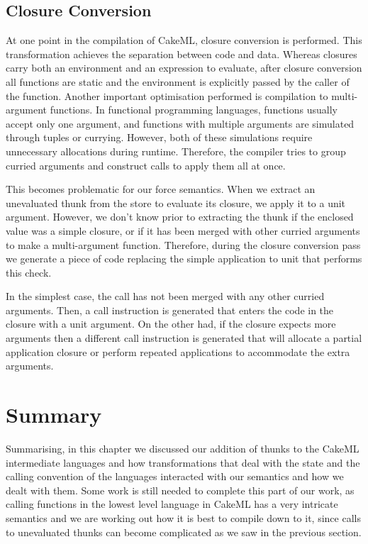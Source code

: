 \subsection{Closure Conversion}

At one point in the compilation of CakeML, closure conversion
\cite{reynolds1972definitional} is performed. This transformation achieves the
separation between code and data. Whereas closures carry both an environment and
an expression to evaluate, after closure conversion all functions are static
and the environment is explicitly passed by the caller of the function.
Another important optimisation performed is compilation to multi-argument
functions. In functional programming languages, functions usually accept only
one argument, and functions with multiple arguments are simulated through tuples
or currying. However, both of these simulations require unnecessary allocations
during runtime. Therefore, the compiler tries to group curried arguments and
construct calls to apply them all at once.

This becomes problematic for our force semantics. When we extract an unevaluated
thunk from the store to evaluate its closure, we apply it to a unit argument.
However, we don't know prior to extracting the thunk if the enclosed value was a
simple closure, or if it has been merged with other curried arguments to make a
multi-argument function. Therefore, during the closure conversion pass we
generate a piece of code replacing the simple application to unit that performs
this check.

In the simplest case, the call has not been merged with any other curried
arguments. Then, a call instruction is generated that enters the code in the
closure with a unit argument. On the other had, if the closure expects more
arguments then a different call instruction is generated that will allocate a
partial application closure or perform repeated applications to accommodate the
extra arguments.

\section{Summary}

Summarising, in this chapter we discussed our addition of thunks to the CakeML
intermediate languages and how transformations that deal with the state and the
calling convention of the languages interacted with our semantics and how we
dealt with them. Some work is still needed to complete this part of our work, as
calling functions in the lowest level language in CakeML has a very intricate
semantics and we are working out how it is best to compile down to it, since
calls to unevaluated thunks can become complicated as we saw in the previous
section.
